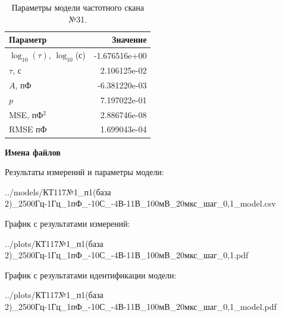 \begin{table}[!ht]
    \centering
    \caption{Параметры модели частотного скана №31.}
    \begin{tabular}{|l|r|}
        \hline
        Параметр                                       & Значение                  \\ \hline
        $\log_{10}(\tau)$, $\log_{10}$(с)              & -1.676516e+00             \\ \hline
        $\tau$, с                                      & 2.106125e-02              \\ \hline
        $A$, пФ                                        & -6.381220e-03             \\ \hline
        $p$                                            & 7.197022e-01              \\ \hline
        MSE, пФ$^2$                                    & 2.886746e-08              \\ \hline
        RMSE пФ                                        & 1.699043e-04              \\ \hline
    \end{tabular}
    \label{table:frequency_scan_model_31}
\end{table}

\textbf{Имена файлов}

Результаты измерений и параметры модели:

\scriptsize../models/КТ117№1\_п1(база 2)\_2500Гц-1Гц\_1пФ\_-10С\_-4В-11В\_100мВ\_20мкс\_шаг\_0,1\_model.csv
\normalsize

График с результатами измерений:

\scriptsize../plots/КТ117№1\_п1(база 2)\_2500Гц-1Гц\_1пФ\_-10С\_-4В-11В\_100мВ\_20мкс\_шаг\_0,1.pdf
\normalsize

График с результатами идентификации модели:

\scriptsize../plots/КТ117№1\_п1(база 2)\_2500Гц-1Гц\_1пФ\_-10С\_-4В-11В\_100мВ\_20мкс\_шаг\_0,1\_model.pdf
\normalsize

